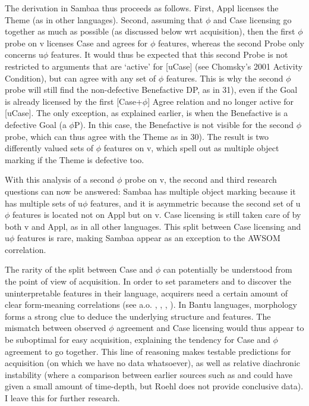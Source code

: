 \documentclass[output=paper
,modfonts
,nonflat]{langsci/langscibook}
\begin{document}
The derivation in Sambaa thus proceeds as follows. First, Appl licenses the Theme (as in other languages). Second, assuming that $\phi$ and Case licensing go together as much as possible (as discussed below wrt acquisition), then the first $\phi$ probe on v licenses Case and agrees for $\phi$ features, whereas the second Probe only concerns u$\phi$ features. It would thus be expected that this second Probe is not restricted to arguments that are ‘active’ for [uCase] (see Chomsky’s 2001 Activity Condition), but can agree with any set of $\phi$ features. This is why the second $\phi$ probe will still find the non-defective Benefactive DP, as in 31), even if the Goal is already licensed by the first [Case+$\phi$] Agree relation and no longer active for [uCase]. The only exception, as explained earlier, is when the Benefactive is a defective Goal (a $\phi$P). In this case, the Benefactive is not visible for the second $\phi$ probe, which can thus agree with the Theme as in 30). The result is two differently valued sets of $\phi$ features on v, which spell out as multiple object marking if the Theme is defective too.

With this analysis of a second $\phi$ probe on v, the second and third research questions can now be answered: Sambaa has multiple object marking because it has multiple sets of u$\phi$ features, and it is asymmetric because the second set of u$\phi$ features is located not on Appl but on v. Case licensing is still taken care of by both v and Appl, as in all other languages. This split between Case licensing and u$\phi$ features is rare, making Sambaa appear as an exception to the AWSOM correlation.

The rarity of the split between Case and $\phi$ can potentially be understood from the point of view of acquisition. In order to set parameters and to discover the uninterpretable features in their language, acquirers need a certain amount of clear form-meaning correlations (see a.o. \citealt{Biberauer2017a}, \citealt{Biberauer2017b}, \citealt{Biberauer_Roberts2017},  \citealt{Fasanella_Fortuny2016}). In Bantu languages, morphology forms a strong clue to deduce the underlying structure and features. The mismatch between observed $\phi$ agreement and Case licensing would thus appear to be suboptimal for easy acquisition, explaining the tendency for Case and $\phi$ agreement to go together. This line of reasoning makes testable predictions for acquisition (on which we have no data whatsoever), as well as relative diachronic instability (where a comparison between earlier sources such as \citealt{Roehl1911} and \citealt{Riedel2009} could have given a small amount of time-depth, but Roehl does not provide conclusive data). I leave this for further research.
\end{document}
